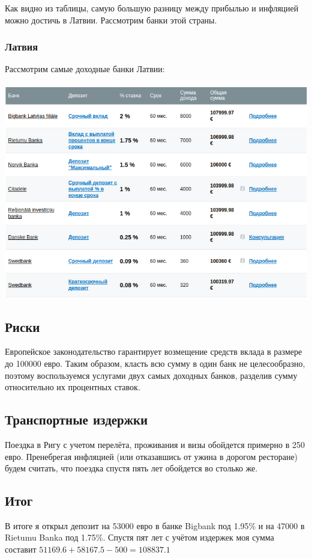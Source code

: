Как видно из таблицы, самую большую разницу между прибылью и инфляцией можно достичь в Латвии. Рассмотрим банки этой страны.

\subsubsection{Латвия}
Рассмотрим самые доходные банки Латвии:
\\
\\

\includegraphics[width=16cm]{pics/nikita/latvia.png}

\subsection{Риски}
Европейское законодательство гарантирует возмещение средств вклада в размере до 100000 евро. Таким образом, класть всю сумму в один банк не целесообразно, поэтому воспользуемся услугами двух самых доходных банков, разделив сумму относительно их процентных ставок.

\subsection{Транспортные издержки}
Поездка в Ригу с учетом перелёта, проживания и визы обойдется примерно в 250 евро. Пренебрегая инфляцией (или отказавшись от ужина в дорогом ресторане) будем считать, что поездка спустя пять лет обойдется во столько же.

\subsection{Итог}
В итоге я открыл депозит на 53000 евро в банке Bigbank под 1.95\% и на 47000 в Rietumu Banka под 1.75\%. Спустя пят лет с учётом издержек моя сумма составит $51169.6 + 58167.5 - 500 = 108837.1$

 

